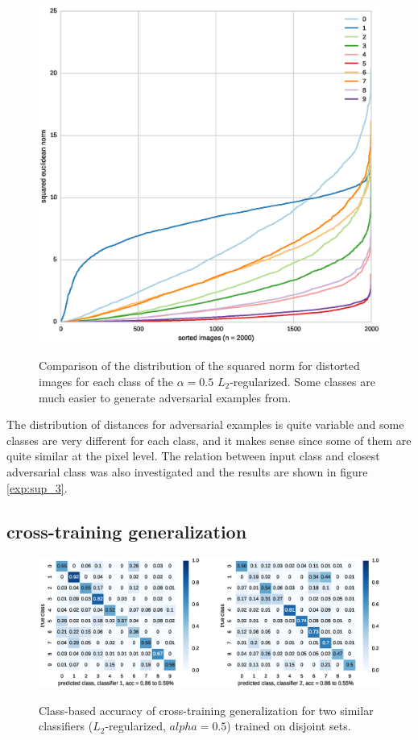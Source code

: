 \documentclass{article} %
\begin{document}
\begin{figure}[h!]
\begin{center}
\includegraphics[scale=0.6]{figs/sup_4}
\label{exp:sup_4}
\caption{\small Comparison of the distribution of the squared norm for distorted images for each class of the
$\alpha=0.5$ $L_2$-regularized. Some classes are much
easier to generate adversarial examples from.}
\end{center}
\end{figure}

The distribution of distances for adversarial examples is quite variable and some classes are very
different for each class, and it makes sense since some of them are quite similar at the pixel level. The relation between input class and closest adversarial class was also investigated and
the results are shown in figure \ref{exp:sup_3}.

\subsection{cross-training generalization}

\begin{figure}[h!]
\begin{center}
\includegraphics[scale=0.5]{figs/sup_6}
\label{exp:sup_6}
\caption{\small Class-based accuracy of cross-training generalization for two similar classifiers ($L_2$-regularized, $alpha=0.5$) trained on disjoint sets.}
\end{center}
\end{figure}
\end{document}
